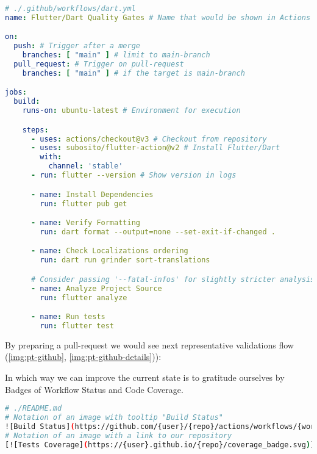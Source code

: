 \begin{lstlisting}[language=yaml]
# ./.github/workflows/dart.yml
name: Flutter/Dart Quality Gates # Name that would be shown in Actions tab

on:
  push: # Trigger after a merge
    branches: [ "main" ] # limit to main-branch
  pull_request: # Trigger on pull-request
    branches: [ "main" ] # if the target is main-branch

jobs:
  build:
    runs-on: ubuntu-latest # Environment for execution

    steps:
      - uses: actions/checkout@v3 # Checkout from repository
      - uses: subosito/flutter-action@v2 # Install Flutter/Dart
        with:
          channel: 'stable'
      - run: flutter --version # Show version in logs

      - name: Install Dependencies
        run: flutter pub get

      - name: Verify Formatting
        run: dart format --output=none --set-exit-if-changed .

      - name: Check Localizations ordering
        run: dart run grinder sort-translations

      # Consider passing '--fatal-infos' for slightly stricter analysis.
      - name: Analyze Project Source
        run: flutter analyze

      - name: Run tests
        run: flutter test
\end{lstlisting}

\noindent By preparing a pull-request we would see next representative validations flow 
(\cref{img:pt-github}, \cref{img:pt-github-details})):



In which way we can improve the current state is to gratitude ourselves by Badges of Workflow Status and Code Coverage.

\begin{lstlisting}[language=bash]
# ./README.md
# Notation of an image with tooltip "Build Status" 
![Build Status](https://github.com/{user}/{repo}/actions/workflows/{workflow-name}.yml/badge.svg?branch=main)
# Notation of an image with a link to our repository
[![Tests Coverage](https://{user}.github.io/{repo}/coverage_badge.svg)](https://github.com/{user}/{repo})
\end{lstlisting}

